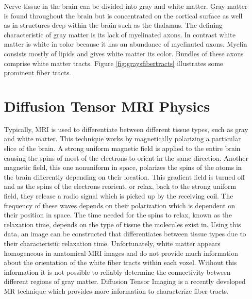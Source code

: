 Nerve tissue in the brain can be divided into gray and white matter.  Gray matter is found throughout the brain but is concentrated on the cortical surface as well as in structures deep within the brain such as the thalamus.  The defining characteristic of gray matter is its lack of myelinated axons.  In contrast white matter is white in color because it has an abundance of myelinated axons.  Myelin consists mostly of lipids and gives white matter its color.  Bundles of these axons comprise white matter tracts. Figure \ref{fig:graysfibertracts} illustrates some prominent fiber tracts.

\section{Diffusion Tensor MRI Physics}

Typically, MRI is used to differentiate between different tissue types, such as gray and white matter.  This technique works by magnetically polarizing a particular slice of the brain.  A strong uniform magnetic field is applied to the entire brain causing the spins of most of the electrons to orient in the same direction.  Another magnetic field, this one nonuniform in space, polarizes the spins of the atoms in the brain differently depending on their location.  This gradient field is turned off and as the spins of the electrons reorient, or relax, back to the strong uniform field, they release a radio signal which is picked up by the receiving coil.  The frequency of these waves depends on their polarization which is dependent on their position in space.  The time needed for the spins to relax, known as the relaxation time, depends on the type of tissue the molecules exist in.  Using this data, an image can be constructed that differentiates between tissue types due to their characteristic relaxation time. Unfortunately, white matter appears homogeneous in anatomical MRI images and do not provide much information about the orientation of the white fiber tracts within each voxel.  Without this information it is not possible to reliably determine the connectivity between different regions of gray matter.  Diffusion Tensor Imaging is a recently developed MR technique which provides more information to characterize fiber tracts.

